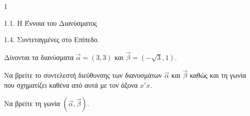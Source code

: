 \begin{ylh}{1}
    \item 1.1. Η Έννοια του Διανύσματος
    \item 1.4. Συντεταγμένες στο Επίπεδο.
\end{ylh}
Δίνονται τα διανύσματα $\vec{\alpha} = (3,3)$ και $\vec{\beta} = (-\sqrt{3},1)$.
\begin{alist}
\item Να βρείτε το συντελεστή διεύθυνσης των διανυσμάτων $\vec{\alpha}$ και $\vec{\beta}$ καθώς και τη γωνία που σχηματίζει καθένα από αυτά με τον άξονα $x'x$. 
\item Να βρείτε τη γωνία $(\vec{\alpha}, \vec{\beta})$. 
\end{alist}